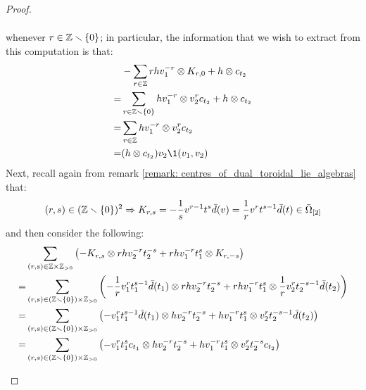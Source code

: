 \begin{proof}
\begin{enumerate}
$$\begin{aligned}
                                \end{aligned}
                            $$
                        whenever $r \in \Z \setminus \{0\}$; in particular, the information that we wish to extract from this computation is that:
                            $$
                                \begin{aligned}
                                    & -\sum_{r \in \Z} r h v_1^{-r} \tensor K_{r, 0} + h \tensor c_{t_2}
                                    \\
                                    = & \sum_{r \in \Z \setminus \{0\}} h v_1^{-r} \tensor v_2^r c_{t_2} + h \tensor c_{t_2}
                                    \\
                                    = & \sum_{r \in \Z} h v_1^{-r} \tensor v_2^r c_{t_2}
                                    \\
                                    = & (h \tensor c_{t_2}) v_2 \1(v_1, v_2)
                                \end{aligned}
                            $$
                        Next, recall again from remark \ref{remark: centres_of_dual_toroidal_lie_algebras} that:
                            $$(r, s) \in (\Z \setminus \{0\})^2 \implies K_{r, s} = -\frac1s v^{r - 1} t^s \bar{d}(v) = \frac1r v^r t^{s - 1} \bar{d}(t) \in \bar{\Omega}_{[2]}$$
                        and then consider the following:
                            $$
                                \begin{aligned}
                                    & \sum_{(r, s) \in \Z \x \Z_{> 0}} \left( -K_{r, s} \tensor r h v_2^{-r} t_2^{-s} + r h v_1^{-r} t_1^s \tensor K_{r, -s} \right)
                                    \\
                                    = & \sum_{(r, s) \in (\Z \setminus \{0\}) \x \Z_{> 0}} \left( -\frac1r v_1^r t_1^{s - 1} \bar{d}(t_1) \tensor r h v_2^{-r} t_2^{-s} + r h v_1^{-r} t_1^s \tensor \frac1r v_2^r t_2^{-s - 1} \bar{d}(t_2) \right)
                                    \\
                                    = & \sum_{(r, s) \in (\Z \setminus \{0\}) \x \Z_{> 0}} \left( -v_1^r t_1^{s - 1} \bar{d}(t_1) \tensor h v_2^{-r} t_2^{-s} + h v_1^{-r} t_1^s \tensor v_2^r t_2^{-s - 1} \bar{d}(t_2) \right)
                                    \\
                                    = & \sum_{(r, s) \in (\Z \setminus \{0\}) \x \Z_{> 0}} \left( -v_1^r t_1^s c_{t_1} \tensor h v_2^{-r} t_2^{-s} + h v_1^{-r} t_1^s \tensor v_2^r t_2^{-s} c_{t_2} \right)

\end{aligned}$$
\end{enumerate}
\end{proof}
